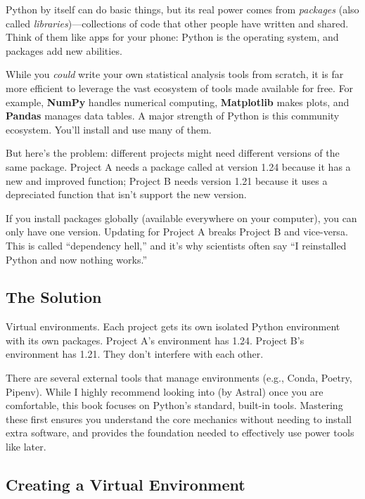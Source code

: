 Python by itself can do basic things, but its real power comes from \emph{packages} (also called \emph{libraries})---collections of code that other people have written and shared. Think of them like apps for your phone: Python is the operating system, and packages add new abilities.

While you \emph{could} write your own statistical analysis tools from scratch, it is far more efficient to leverage the vast ecosystem of tools made available for free. For example, \textbf{NumPy} handles numerical computing, \textbf{Matplotlib} makes plots, and \textbf{Pandas} manages data tables. A major strength of Python is this community ecosystem. You'll install and use many of them.

But here's the problem: different projects might need different versions of the same package. Project A needs a package called  at version 1.24 because it has a new and improved function; Project B needs  version 1.21 because it uses a depreciated function that isn't support the new version.

If you install packages globally (available everywhere on your computer), you can only have one version. Updating for Project A breaks Project B and vice-versa. This is called ``dependency hell,'' and it's why scientists often say ``I reinstalled Python and now nothing works.''

\subsection{The Solution}

Virtual environments. Each project gets its own isolated Python environment with its own packages. Project A's environment has  1.24. Project B's environment has  1.21. They don't interfere with each other.

There are several external tools that manage environments (e.g., Conda, Poetry, Pipenv). While I highly recommend looking into  (by Astral) once you are comfortable, this book focuses on Python's standard, built-in tools. Mastering these first ensures you understand the core mechanics without needing to install extra software, and provides the foundation needed to effectively use power tools like  later.

\subsection{Creating a Virtual Environment}

